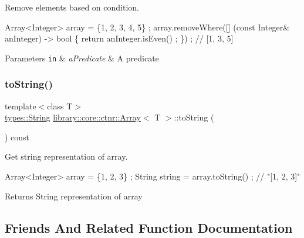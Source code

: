 Remove elements based on condition. 


\begin{DoxyCode}
Array<Integer> array = \{1, 2, 3, 4, 5\} ;
array.removeWhere([] (\textcolor{keyword}{const} Integer& anInteger) -> \textcolor{keywordtype}{bool} \{ \textcolor{keywordflow}{return} anInteger.isEven() ; \}) ; \textcolor{comment}{// [1, 3, 5]}
\end{DoxyCode}



\begin{DoxyParams}[1]{Parameters}
\mbox{\tt in}  & {\em a\+Predicate} & A predicate \\
\hline
\end{DoxyParams}
\mbox{\label{classlibrary_1_1core_1_1ctnr_1_1_array_a90622afd5860fedd7d04e6518c096ffa}} 
\subsubsection{\texorpdfstring{to\+String()}{toString()}}
{\footnotesize\ttfamily template$<$class T$>$ \\
\hyperlink{classlibrary_1_1core_1_1types_1_1_string}{types\+::\+String} \hyperlink{classlibrary_1_1core_1_1ctnr_1_1_array}{library\+::core\+::ctnr\+::\+Array}$<$ T $>$\+::to\+String (\begin{DoxyParamCaption}{ }\end{DoxyParamCaption}) const}



Get string representation of array. 


\begin{DoxyCode}
Array<Integer> array = \{1, 2, 3\} ;
String \textcolor{keywordtype}{string} = array.toString() ; \textcolor{comment}{// "[1, 2, 3]"}
\end{DoxyCode}


\begin{DoxyReturn}{Returns}
String representation of array 
\end{DoxyReturn}


\subsection{Friends And Related Function Documentation}
\mbox{\label{classlibrary_1_1core_1_1ctnr_1_1_array_a9daa2d638e5bd693776f8bf6caae0802}} 
